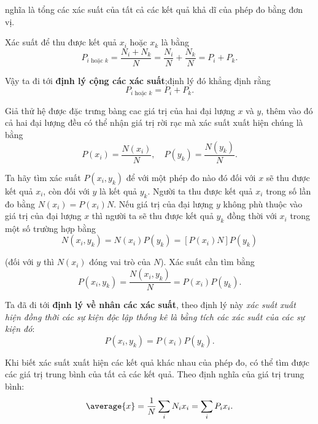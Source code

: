 \noindent
nghĩa là tổng các xác suất của tất cả các kết quả khả dĩ của phép đo bằng đơn vị.

Xác suất để thu được kết quả $x_i$ hoặc $x_k$ là bằng
\begin{equation*}
	P_{i\text{ hoặc }k} = \frac{N_i + N_k}{N} = \frac{N_i}{N} + \frac{N_k}{N} = P_i + P_k.
\end{equation*}


\noindent
Vậy ta đi tới \textbf{định lý cộng các xác suất};định lý đó khẳng định rằng
\begin{equation}\label{eq:11_3}
	P_{i\text{ hoặc }k} = P_i + P_k.
\end{equation}

Giả thử hệ được đặc trưng bàng cac giá trị của hai đại lượng $x$ và $y$, thêm vào đó cả hai đại lượng đều có thể nhận giá trị rời rạc mà xác suất xuất hiện chúng là bằng
\begin{equation*}
	P(x_i) = \frac{N(x_i)}{N},\quad P(y_k) = \frac{N(y_k)}{N}.
\end{equation*}

\noindent 
Ta hãy tìm xác suất $P(x_i,y_k)$ để với một phép đo nào đó đối với $x$ sẽ thu được kết quả $x_i$, còn đối với $y$ là kết quả $y_k$. Người ta thu được kết quả $x_i$ trong số lần đo bằng $N(x_i)=P(x_i)N$. Nếu giá trị của đại lượng $y$ không phù thuộc vào giá trị của đại lượng $x$ thì người ta sẽ thu được kết quả $y_k$ đồng thời với $x_i$ trong một số trường hợp bằng
\begin{equation*}
	N(x_i,y_k) = N(x_i) P(y_k) = [P(x_i) N] P(y_k)
\end{equation*}

\noindent
(đối với $y$ thì $N(x_i)$ đóng vai trò của $N$). Xác suất cần tìm bằng
\begin{equation*}
	P(x_i,y_k) = \frac{N(x_i,y_k)}{N} = P(x_i) P(y_k).
\end{equation*}

\noindent
Ta đã đi tới \textbf{định lý về nhân các xác suất}, theo định lý này  \textit{xác suất xuất hiện đồng thời các sự kiện độc lập thống kê là bằng tích các xác suất của các sự kiện đó}:
\begin{equation}\label{eq:11_4}
	P(x_i,y_k) = P(x_i) P(y_k).
\end{equation}

Khi biết xác suất xuất hiện các kết quả khác nhau của phép đo, có thể tìm được các giá trị trung bình của tất cả các kết quả. Theo định nghĩa của giá trị trung bình:
\begin{equation}\label{eq:11_5}
	\average{x} = \frac{1}{N}\sum_i N_i x_i = \sum_i P_i x_i.
\end{equation}

